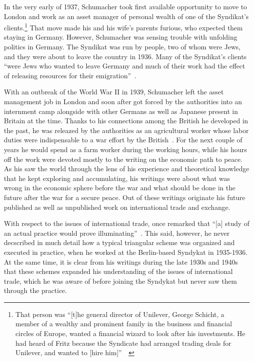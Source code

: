 In the very early of 1937, Schumacher took first available opportunity to move to London and work as an asset manager of personal wealth of one of the Syndikat's clients.\footnote{That person was ``[t]he general director of Unilever, George Schicht, a member of a wealthy and prominent family in the business and financial circles of Europe, wanted a financial wizard to look after his investments. He had heard of Fritz because the Syndicate had arranged trading deals for Unilever, and wanted to [hire him]''~~\cite[p.~85-86]{wood1984}} That move made his and his wife's parents furious, who expected them staying in Germany. However, Schumacher was sensing trouble with unfolding politics in Germany. The Syndikat was run by people, two of whom were Jews, and they were about to leave the country in 1936. Many of the Syndikat's clients ``were Jews who wanted to leave Germany and much of their work had the effect of releasing resources for their emigration''~\cite[p.~84]{wood1984}. 

With an outbreak of the World War II in 1939, Schumacher left the asset management job in London and soon after got forced by the authorities into an internment camp alongside with other Germans as well as Japanese present in Britain at the time. Thanks to his connections among the British he developed in the past, he was releazed by the authorities as an agricultural worker whose labor duties were indispensable to a war effort by the British~\cite[p.~114]{wood1984}. For the next couple of years he would spend as a farm worker during the working hours, while his hours off the work were devoted mostly to the writing on the economic path to peace. As his saw the world through the lens of his experience and theoretical knowledge that he kept exploring and accumulating, his writings were about what was wrong in the economic sphere before the war and what should be done in the future after the war for a secure peace. Out of these writings originate his future published as well as unpublished work on international trade and exchange.

With respect to the issues of international trade, \citeauthor{schumacher1942} once remarked that ``[a] study of an actual practice would prove illuminating''~\citep[p.~235]{schumacher1942}. This said, however, he never decscribed in much detail how a typical triangular scheme was organized and executed in practice, when he worked at the Berlin-based Syndykat in 1935-1936. At the same time, it is clear from his writings during the late 1930s and 1940s that these schemes expanded his understanding of the issues of international trade, which he was aware of before joining the Syndykat but never saw them through the practice. 

